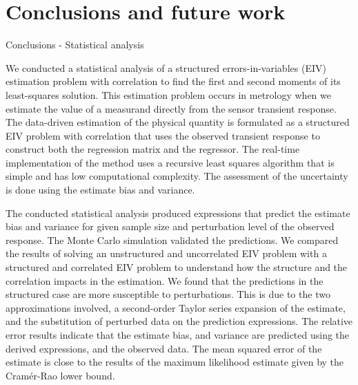 \glsresetall

\chapter{Conclusions and \linebreak future work} \label{chap:concl}

\vfill{}



Conclusions - Statistical analysis

 We conducted a statistical analysis of a structured errors-in-variables (EIV) estimation problem with correlation to find the first and second moments of its least-squares solution.
This estimation problem occurs in metrology when we estimate the value of a measurand directly from the sensor transient response.
The data-driven estimation of the physical quantity is formulated as a structured EIV problem with correlation that uses the observed transient response to construct both the regression matrix and the regressor.
The real-time implementation of the method uses a recursive least squares algorithm that is simple and has low computational complexity.
The assessment of the uncertainty is done using the estimate bias and variance.

The conducted statistical analysis produced expressions that predict the estimate bias and variance for given sample size and perturbation level of the observed response.
The Monte Carlo simulation validated the predictions.
We compared the results of solving an unstructured and uncorrelated EIV problem with a structured and correlated EIV problem to understand how the structure and the correlation impacts in the estimation.
We found that the predictions in the structured case are more susceptible to perturbations.
This is due to the two approximations involved, a second-order Taylor series expansion of the estimate, and the substitution of perturbed data on the prediction expressions.
The relative error results indicate that the estimate bias, and variance are predicted using the derived expressions, and the observed data.
The mean squared error of the estimate is close to the results of the maximum likelihood estimate given by the Cram\'er-Rao lower bound.

